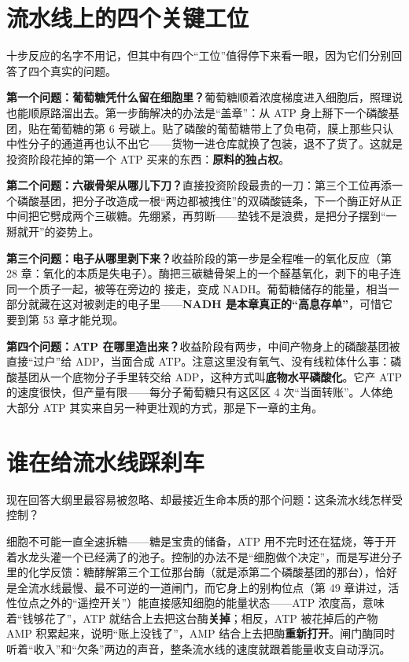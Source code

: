 \section{流水线上的四个关键工位}

十步反应的名字不用记，但其中有四个“工位”值得停下来看一眼，因为它们分别回答了四个真实的问题。

\textbf{第一个问题：葡萄糖凭什么留在细胞里？}葡萄糖顺着浓度梯度进入细胞后，照理说也能顺原路溜出去。第一步酶解决的办法是“盖章”：从 ATP 身上掰下一个磷酸基团，贴在葡萄糖的第 6 号碳上。贴了磷酸的葡萄糖带上了负电荷，膜上那些只认中性分子的通道再也认不出它——货物一进仓库就换了包装，退不了货了。这就是投资阶段花掉的第一个 ATP 买来的东西：\textbf{原料的独占权}。

\textbf{第二个问题：六碳骨架从哪儿下刀？}直接投资阶段最贵的一刀：第三个工位再添一个磷酸基团，把分子改造成一根“两边都被拽住”的双磷酸链条，下一个酶正好从正中间把它劈成两个三碳糖。先绷紧，再剪断——垫钱不是浪费，是把分子摆到“一掰就开”的姿势上。

\textbf{第三个问题：电子从哪里剥下来？}收益阶段的第一步是全程唯一的氧化反应（第 28 章：氧化的本质是失电子）。酶把三碳糖骨架上的一个醛基氧化，剥下的电子连同一个质子一起，被等在旁边的  接走，变成 NADH。葡萄糖储存的能量，相当一部分就藏在这对被剥走的电子里——\textbf{NADH 是本章真正的“高息存单”}，可惜它要到第 53 章才能兑现。

\textbf{第四个问题：ATP 在哪里造出来？}收益阶段有两步，中间产物身上的磷酸基团被直接“过户”给 ADP，当面合成 ATP。注意这里没有氧气、没有线粒体什么事：磷酸基团从一个底物分子手里转交给 ADP，这种方式叫\textbf{底物水平磷酸化}。它产 ATP 的速度很快，但产量有限——每分子葡萄糖只有这区区 4 次“当面转账”。人体绝大部分 ATP 其实来自另一种更壮观的方式，那是下一章的主角。

\section{谁在给流水线踩刹车}

现在回答大纲里最容易被忽略、却最接近生命本质的那个问题：这条流水线怎样受控制？

细胞不可能一直全速拆糖——糖是宝贵的储备，ATP 用不完时还在猛烧，等于开着水龙头灌一个已经满了的池子。控制的办法不是“细胞做个决定”，而是写进分子里的化学反馈：糖酵解第三个工位那台酶（就是添第二个磷酸基团的那台），恰好是全流水线最慢、最不可逆的一道闸门，而它身上的别构位点（第 49 章讲过，活性位点之外的“遥控开关”）能直接感知细胞的能量状态——ATP 浓度高，意味着“钱够花了”，ATP 就结合上去把这台酶\textbf{关掉}；相反，ATP 被花掉后的产物 AMP 积累起来，说明“账上没钱了”，AMP 结合上去把酶\textbf{重新打开}。闸门酶同时听着“收入”和“欠条”两边的声音，整条流水线的速度就跟着能量收支自动浮沉。

